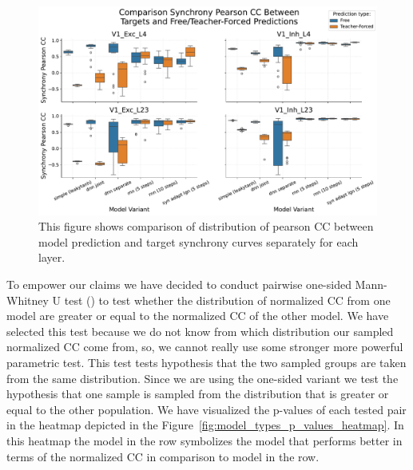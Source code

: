 \begin{figure}
    \centering
    \includegraphics[width=\linewidth]{img/plots/boxplot_model_comparison_synchrony_pearson_layers.pdf}
    \caption{This figure shows comparison of distribution of pearson CC between model prediction and target synchrony curves separately for each layer.}
    \label{fig:boxplot_models_pearson_synchrony_different_layers}
\end{figure}

To empower our claims we have decided to conduct pairwise one-sided Mann-Whitney U test (\citet{mann_whithey_1947}) to test whether the distribution of normalized CC from one model are greater or equal to the normalized CC of the other model. We have selected this test because we do not know from which distribution our sampled normalized CC come from, so, we cannot really use some stronger more powerful parametric test. This test tests hypothesis that the two sampled groups are taken from the same distribution. Since we are using the one-sided variant we test the hypothesis that one sample is sampled from the distribution that is greater or equal to the other population. We have visualized the p-values of each tested pair in the heatmap depicted in the Figure~\ref{fig:model_types_p_values_heatmap}. In this heatmap the model in the row symbolizes the model that performs better in terms of the normalized CC in comparison to model in the row.

